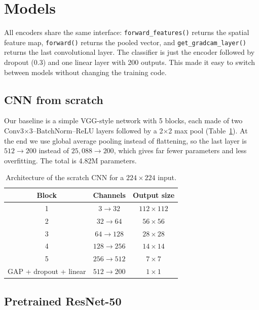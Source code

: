 \documentclass[11pt,a4paper]{article}
\newcommand{\code}[1]{\texttt{\small #1}}
\begin{document}
\section{Models}

All encoders share the same interface: \code{forward\_features()} returns the spatial feature map, \code{forward()} returns the pooled vector, and \code{get\_gradcam\_layer()} returns the last convolutional layer. The classifier is just the encoder followed by dropout (0.3) and one linear layer with 200 outputs. This made it easy to switch between models without changing the training code.

\subsection{CNN from scratch}

Our baseline is a simple VGG-style network with 5 blocks, each made of two Conv3$\times$3--BatchNorm--ReLU layers followed by a 2$\times$2 max pool (Table~\ref{tab:scratch}). At the end we use global average pooling instead of flattening, so the last layer is $512\to200$ instead of $25{,}088\to200$, which gives far fewer parameters and less overfitting. The total is 4.82M parameters.

\begin{table}[H]
\centering
\small
\begin{tabular}{c c c}
\toprule
\textbf{Block} & \textbf{Channels} & \textbf{Output size} \\
\midrule
1 & $3 \to 32$    & $112\times112$ \\
2 & $32 \to 64$   & $56\times56$ \\
3 & $64 \to 128$  & $28\times28$ \\
4 & $128 \to 256$ & $14\times14$ \\
5 & $256 \to 512$ & $7\times7$ \\
GAP + dropout + linear & $512 \to 200$ & $1\times1$ \\
\bottomrule
\end{tabular}
\caption{Architecture of the scratch CNN for a $224\times224$ input.}
\label{tab:scratch}
\end{table}

\subsection{Pretrained ResNet-50}
\end{document}
